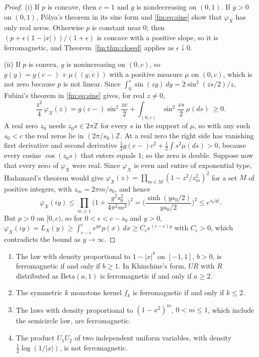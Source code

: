 \begin{proof}
(i) If $p$ is concave, then $c=1$ and $g$ is nondecreasing on $(0,1)$. If $g>0$ on $(0,1)$, P\'olya's theorem in its sine form and \eqref{fm:eq:sine} show that $\varphi_X$ has only real zeros. Otherwise $p$ is constant near $0$; then $(p+\epsilon(1-|x|))/(1+\epsilon)$ is concave with a positive slope, so it is ferromagnetic, and Theorem~\ref{fm:thm:closed} applies as $\epsilon\downarrow0$.

(ii) If $p$ is convex, $g$ is nonincreasing on $(0,c)$, so $g(y)=g(c-)+\mu((y,c))$ with a positive measure $\mu$ on $(0,c)$, which is not zero because $p$ is not linear. Since $\int_0^s\sin(zy)\,dy=2\sin^2(zs/2)/z$, Fubini's theorem in \eqref{fm:eq:sine} gives, for real $z\ne0$,
\[
\frac{z^2}4\,\varphi_X(z)=g(c-)\sin^2\frac{zc}2+\int_{(0,c)}\sin^2\frac{zs}2\,\mu(ds)\ \ge0 .
\]
A real zero $z_0$ needs $z_0s\in2\pi\mathbb Z$ for every $s$ in the support of $\mu$, so with any such $s_0<c$ the real zeros lie in $(2\pi/s_0)\mathbb Z$. At a real zero the right side has vanishing first derivative and second derivative $\frac12g(c-)c^2+\frac12\int s^2\mu(ds)>0$, because every cosine $\cos(z_0s)$ that enters equals $1$; so the zero is double. Suppose now that every zero of $\varphi_X$ were real. Since $\varphi_X$ is even and entire of exponential type, Hadamard's theorem would give $\varphi_X(z)=\prod_{m\in M}(1-z^2/z_m^2)^2$ for a set $M$ of positive integers, with $z_m=2\pi m/s_0$, and hence
\[
\varphi_X(iy)\le\prod_{m\ge1}\Big(1+\frac{y^2s_0^2}{4\pi^2m^2}\Big)^2=\Big(\frac{\sinh(ys_0/2)}{ys_0/2}\Big)^2\le e^{s_0|y|}.
\]
But $p>0$ on $[0,c)$, so for $0<\epsilon<c-s_0$ and $y>0$, $\varphi_X(iy)=L_X(y)\ge\int_{c-\epsilon}^ce^{yx}p(x)\,dx\ge C_\epsilon e^{(c-\epsilon)y}$ with $C_\epsilon>0$, which contradicts the bound as $y\to\infty$.
\end{proof}



\begin{corollary}\label{fm:cor:shoulder}
\begin{enumerate}
\item[(i)] The law with density proportional to $1-|x|^b$ on $[-1,1]$, $b>0$, is ferromagnetic if and only if $b\ge1$. In Khinchine's form, $UR$ with $R$ distributed as $\mathrm{Beta}(a,1)$ is ferromagnetic if and only if $a\ge2$.
\item[(ii)] The symmetric $k$ monotone kernel $f_k$ is ferromagnetic if and only if $k\le2$.
\item[(iii)] The laws with density proportional to $(1-x^2)^m$, $0<m\le1$, which include the semicircle law, are ferromagnetic.
\item[(iv)] The product $U_1U_2$ of two independent uniform variables, with density $\frac12\log(1/|x|)$, is not ferromagnetic.
\end{enumerate}
\end{corollary}

